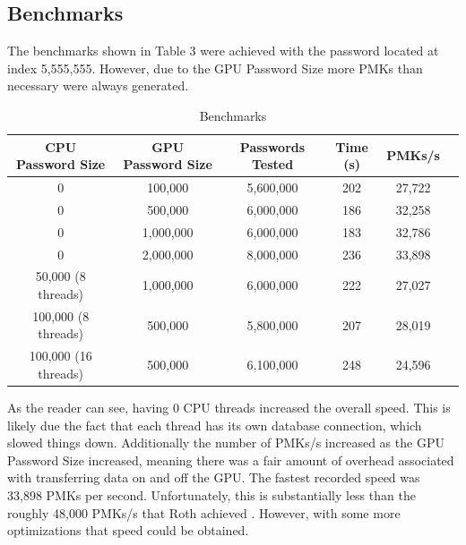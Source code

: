 \documentclass[12pt]{article}
\begin{document}
\subsection{Benchmarks}
\indent The benchmarks shown in Table 3 were achieved with the password located at index 5,555,555. However, due to the GPU Password Size more PMKs than necessary were always generated.
\begin{table}[htbp]
\centering
\begin{tabular}{ |c|c|c|c|c|c|}  %
 \hline
 CPU Password Size & GPU Password Size &  Passwords Tested & Time (s) & PMKs/s\\ %
 \hline
 0 & 100,000 & 5,600,000 & 202 & 27,722  \\ %
 \hline
 0 & 500,000 & 6,000,000 & 186 & 32,258 \\ %
 \hline
 0 & 1,000,000 & 6,000,000 & 183 & 32,786 \\ %
 \hline
 0 & 2,000,000 & 8,000,000 & 236 & 33,898 \\ %
 \hline
 50,000 (8 threads) & 1,000,000 & 6,000,000 & 222 & 27,027 \\ %
\hline
 100,000 (8 threads) & 500,000 & 5,800,000 & 207 & 28,019  \\ %
\hline
 100,000 (16 threads) & 500,000 & 6,100,000 & 248 & 24,596  \\ %
\hline
 \end{tabular}
\caption{Benchmarks}
\end{table}
As the reader can see, having 0 CPU threads increased the overall speed. This is likely due the fact that each thread has its own database connection, which slowed things down. Additionally the number of PMKs/s increased as the GPU Password Size increased, meaning there was a fair amount of overhead associated with transferring data on and off the GPU. The fastest recorded speed was 33,898 PMKs per second.  Unfortunately, this is substantially less than the roughly 48,000 PMKs/s that Roth achieved \cite{roth}. However, with some more optimizations that speed could be obtained.
\end{document}
